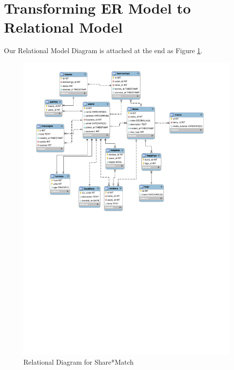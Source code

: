 \documentclass{acm_proc_article-sp}
\begin{document}
\section{Transforming ER Model to Relational Model}
Our Relational Model Diagram is attached at the end as Figure \ref{fig:RelationalDiagram}.
\begin{figure}[p]
    \includegraphics[width=\textwidth]{EECS341Relational.pdf}
    \caption{Relational Diagram for Share*Match}
    \label{fig:RelationalDiagram}
\end{figure}
\end{document}
